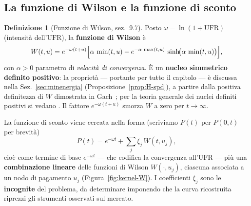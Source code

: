 \documentclass[11pt,a4paper]{article}
\theoremstyle{plain}
\theoremstyle{definition}
\newtheorem{definizione}[teorema]{Definizione}
\theoremstyle{remark}
\newcommand{\UFR}{\ensuremath{\mathrm{UFR}}}
\newcommand{\Qmat}{\mathbf{Q}}
\begin{document}
%
%

\subsection{La funzione di Wilson e la funzione di sconto}
\label{sub:kernel-W}

\begin{definizione}[Funzione di Wilson, \cite{eiopa2025} sez.~9.7]
Posto $\omega = \ln(1+\UFR)$ (intensit\`a dell'$\UFR$), la \textbf{funzione di Wilson} \`e
\[
  W(t,u) = e^{-\omega(t+u)}\Bigl[\alpha\,\min(t,u)
           - e^{-\alpha\,\max(t,u)}\,\sinh\!\bigl(\alpha\,\min(t,u)\bigr)\Bigr],
\]
con $\alpha>0$ parametro di \emph{velocit\`a di convergenza}. \`E un \textbf{nucleo simmetrico
definito positivo}: la propriet\`a --- portante per tutto il capitolo --- \`e discussa nella
Sez.~\ref{sec:minenergia} (Proposizione~\ref{prop:H-spd}), a partire dalla positiva definitezza
di $W$ dimostrata in Gach~\cite{gach2017}; per la teoria generale dei nuclei definiti positivi
si vedano \cite{fasshauer2007,lageras2016}.
Il fattore $e^{-\omega(t+u)}$ smorza $W$ a zero per
$t\to\infty$.%
\end{definizione}

La funzione di sconto viene cercata nella forma (scriviamo $P(t)$ per $P(0,t)$ per brevit\`a)
\begin{equation}
  P(t) = e^{-\omega t} + \textstyle\sum_{j} \xi_j\, W(t,u_j),
  \label{eq:sw-P-W}
\end{equation}
cio\`e come termine di base $e^{-\omega t}$ --- che codifica la convergenza all'$\UFR$ --- pi\`u
una \textbf{combinazione lineare} delle funzioni di Wilson $W(\cdot,u_j)$, ciascuna associata
a un nodo di pagamento $u_j$ (Figura~\ref{fig:kernel-W}). %
I coefficienti $\xi_j$
sono le \textbf{incognite} del problema, da determinare imponendo che la curva ricostruita
riprezzi gli strumenti osservati sul mercato.
\end{document}
